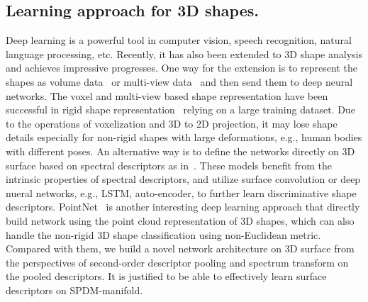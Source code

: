 \documentclass[runningheads]{llncs}
\begin{document}
\subsection{Learning approach for 3D shapes.}
Deep learning is a powerful tool in computer vision, speech recognition, natural language processing, etc. Recently, it has also been extended to 3D shape analysis and achieves impressive progresses. One way for the extension is to  represent the shapes as volume data~\cite{Zhirong,HaoSu1} or multi-view data~\cite{xiangbai1} and then send them to deep neural networks. The voxel and multi-view based shape representation have been successful in rigid shape representation~\cite{HaoSu1,su2015multiview} relying on a large training dataset. Due to the operations of voxelization and 3D to 2D projection, it may lose shape details especially for non-rigid shapes with large deformations, e.g., human bodies with different poses.  An alternative way is to define the networks directly on 3D surface based on spectral descriptors as in~\cite{YiFang1,YiFang3,MMB4,masci2015geodesic}. These models  benefit from the intrinsic properties of  spectral descriptors, and utilize surface convolution or deep nueral networks, e.g., LSTM, auto-encoder,  to further learn  discriminative shape descriptors.  PointNet~\cite{qsmgpdlps3dcs17,qi2017pointnetplusplus}  is another interesting deep learning approach that directly build network using the point cloud representation of 3D shapes, which can also handle the non-rigid 3D shape classification using non-Euclidean metric.  Compared with them, we build  a novel network architecture on 3D surface from the perspectives of  second-order descriptor pooling and spectrum transform on the pooled descriptors. It is justified to be able to effectively learn surface descriptors  on SPDM-manifold.
\end{document}
